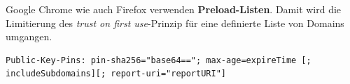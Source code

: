Google Chrome wie auch Firefox verwenden \textbf{Preload-Listen}. Damit wird die Limitierung des \textit{trust on first use}-Prinzip für eine definierte Liste von Domains umgangen.

\begin{lstlisting}[language={},caption=Beispiel des HPKP-Headers]
Public-Key-Pins: pin-sha256="base64=="; max-age=expireTime [; includeSubdomains][; report-uri="reportURI"]
\end{lstlisting}